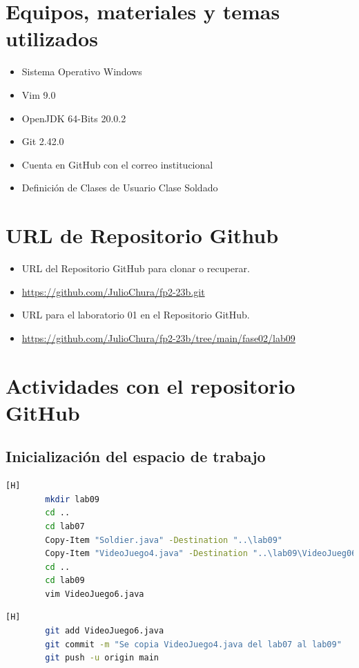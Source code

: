 \documentclass{article}
\begin{document}
	\section{Equipos, materiales y temas utilizados}
	\begin{itemize}
		\item Sistema Operativo Windows
		\item Vim 9.0
		\item OpenJDK 64-Bits 20.0.2
		\item Git 2.42.0
		\item Cuenta en GitHub con el correo institucional
		\item Definición de Clases de Usuario Clase Soldado
	\end{itemize}
	
	\section{URL de Repositorio Github}
	\begin{itemize}
		\item URL del Repositorio GitHub para clonar o recuperar.
		\item \url{https://github.com/JulioChura/fp2-23b.git}
		\item URL para el laboratorio 01 en el Repositorio GitHub.
		\item \url{https://github.com/JulioChura/fp2-23b/tree/main/fase02/lab09}
	\end{itemize}
	
	\section{Actividades con el repositorio GitHub}
	


	\subsection{Inicialización del espacio de trabajo}
	
	\begin{lstlisting}[language=bash,caption={Inicializando el espacio de trabajo}][H]
		mkdir lab09
		cd ..
		cd lab07
		Copy-Item "Soldier.java" -Destination "..\lab09"
		Copy-Item "VideoJuego4.java" -Destination "..\lab09\VideoJueg06.java"
		cd ..
		cd lab09
		vim VideoJuego6.java	
	\end{lstlisting}
	
	\begin{lstlisting}[language=bash,caption={Commit: 24b299f6d4b3ebd17971adadc7057ab72724b41c }][H]
		git add VideoJuego6.java
		git commit -m "Se copia VideoJuego4.java del lab07 al lab09"
		git push -u origin main
	\end{lstlisting}
	
\end{document}
